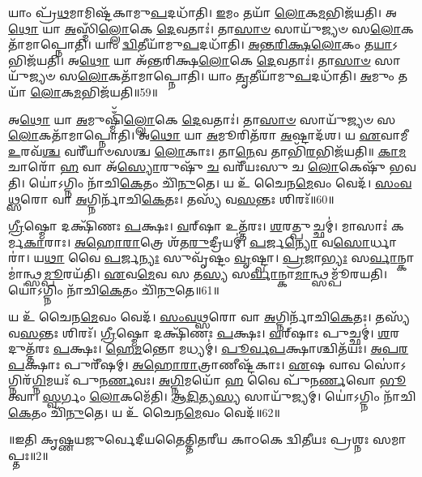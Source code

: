    𑌯𑌾𑌂 𑌪𑍍𑌰᳴\-\ul{𑌥}\-𑌮𑌾𑌮𑌿𑌷𑍍𑌟᳴𑌕𑌾𑌮𑍁\-\ul{𑌪}\-𑌦𑌧𑌾᳴𑌤𑌿।
   \ul{𑌇}\-𑌮𑌂 𑌤𑌯𑌾᳴ \ul{𑌲𑍋}\-𑌕\-\ul{𑌮}\-𑌭𑌿𑌜᳴𑌯𑌤𑌿।
   𑌅\-\ul{𑌥𑍋} 𑌯𑌾 \ul{𑌅}\-𑌸𑍍𑌮𑌿𑌁\-\ul{𑌲𑍍𑌲𑍋}\-𑌕𑍇 \ul{𑌦𑍇}\-𑌵𑌤𑌾𑌃॑।
   𑌤𑌾\-\ul{𑌸𑌾}\-\-\ul{𑍞} 𑌸𑌾𑌯𑍁᳴𑌜𑍍𑌯𑍞 𑌸\-\ul{𑌲𑍋}\-𑌕𑌤𑌾᳴𑌮𑌾\-𑌪𑍍𑌨𑍋𑌤𑌿।
   𑌯𑌾𑌂 \ul{𑌦𑍍𑌵𑌿}\-𑌤𑍀𑌯𑌾᳴𑌮𑍁\-\ul{𑌪}\-𑌦𑌧𑌾᳴𑌤𑌿।
   \ul{𑌅}\-\-\ul{𑌨𑍍𑌤}\-\-\ul{𑌰𑌿}\-\-\ul{𑌕𑍍𑌷}\-\-\ul{𑌲𑍋}\-𑌕𑌂 𑌤\-\ul{𑌯𑌾}\-𑌽𑌭𑌿𑌜᳴𑌯𑌤𑌿।
   𑌅\-\ul{𑌥𑍋} 𑌯𑌾 𑌅᳴𑌨𑍍𑌤𑌰𑌿𑌕𑍍𑌷\-\ul{𑌲𑍋}\-𑌕𑍇 \ul{𑌦𑍇}\-𑌵𑌤𑌾𑌃॑।
   𑌤𑌾\-\ul{𑌸𑌾}\-\-\ul{𑍞} 𑌸𑌾𑌯𑍁᳴𑌜𑍍𑌯𑍞 𑌸\-\ul{𑌲𑍋}\-𑌕𑌤𑌾᳴𑌮𑌾𑌪𑍍𑌨𑍋𑌤𑌿।
   𑌯𑌾𑌂 \ul{𑌤𑍃}\-𑌤𑍀𑌯𑌾᳴𑌮𑍁\-\ul{𑌪}\-𑌦𑌧𑌾᳴𑌤𑌿।
   \ul{𑌅}\-𑌮𑍁𑌂 𑌤𑌯𑌾᳴ \ul{𑌲𑍋}\-𑌕\-\ul{𑌮}\-𑌭𑌿𑌜᳴𑌯𑌤𑌿॥59॥

   𑌅\-\ul{𑌥𑍋} 𑌯𑌾 \ul{𑌅}\-𑌮𑍁𑌷𑍍𑌮𑌿𑌁᳴\-\ul{𑌲𑍍𑌲𑍋}\-𑌕𑍇 \ul{𑌦𑍇}\-𑌵𑌤𑌾𑌃॑।
   𑌤𑌾\-\ul{𑌸𑌾}\-\-\ul{𑍞} 𑌸𑌾𑌯𑍁᳴𑌜𑍍𑌯𑍞 𑌸\-\ul{𑌲𑍋}\-𑌕𑌤𑌾᳴𑌮𑌾\-𑌪𑍍𑌨𑍋𑌤𑌿।
   𑌅\-\ul{𑌥𑍋} 𑌯𑌾 \ul{𑌅}\-𑌮𑍂𑌰𑌿𑌤᳴𑌰𑌾 \ul{𑌅}\-𑌷𑍍𑌟𑌾𑌦᳴𑌶।
   𑌯 \ul{𑌏}\-𑌵𑌾𑌮𑍀 \ul{𑌉}\-𑌰𑌵᳴\-\ul{𑌶𑍍𑌚} 𑌵𑌰𑍀᳴𑌯𑌾𑍞𑌸𑌶𑍍𑌚 \ul{𑌲𑍋}\-𑌕𑌾𑌃।
   𑌤𑌾\-\ul{𑌨𑍇}\-𑌵 𑌤𑌾𑌭𑌿᳴\-\ul{𑌰}\-𑌭𑌿𑌜᳴𑌯𑌤𑌿॥
   \ul{𑌕𑌾}\-\-\ul{𑌮}\-𑌚𑌾𑌰𑍋᳴ \ul{𑌹} 𑌵𑌾 𑌅᳴\-\ul{𑌸𑍍𑌯𑍋}\-𑌰𑍁𑌷𑍁᳴ \ul{𑌚} 𑌵𑌰𑍀᳴𑌯𑌃𑌸𑍁 𑌚 \ul{𑌲𑍋}\-𑌕𑍇𑌷𑍁᳴ 𑌭𑌵𑌤𑌿।
   𑌯𑍋॑𑌽𑌗𑍍𑌨𑌿𑌂 𑌨𑌾᳴𑌚𑌿\-\ul{𑌕𑍇}\-𑌤𑌂 𑌚𑌿᳴\-\ul{𑌨𑍁}\-𑌤𑍇।
   𑌯 𑌉᳴ 𑌚𑍈𑌨\-\ul{𑌮𑍇}\-𑌵𑌂 𑌵𑍇𑌦᳴।
   \ul{𑌸𑌂}\-\-\ul{𑌵}\-\-\ul{𑌥𑍍𑌸}\-𑌰𑍋 𑌵𑌾 \ul{𑌅}\-𑌗𑍍𑌨𑌿𑌰𑍍𑌨𑌾᳴𑌚𑌿\-\ul{𑌕𑍇}\-𑌤𑌃।
   𑌤𑌸𑍍𑌯᳴ 𑌵\-\ul{𑌸}\-𑌨𑍍𑌤𑌃 𑌶𑌿𑌰𑌃᳴॥60॥

   \ul{𑌗𑍍𑌰𑍀}\-𑌷𑍍𑌮𑍋 𑌦𑌕𑍍𑌷𑌿᳴𑌣𑌃 \ul{𑌪}\-𑌕𑍍𑌷𑌃।
   \ul{𑌵}\-𑌰𑍍{‌}𑌷𑌾 𑌉𑌤𑍍𑌤᳴𑌰𑌃।
   \ul{𑌶}\-𑌰𑌤𑍍𑌪𑍁𑌚𑍍𑌛𑌮𑍍॑।
   𑌮𑌾𑌸𑌾𑌃॑ 𑌕𑌰𑍍𑌮\-\ul{𑌕𑌾}\-𑌰𑌾𑌃।
   \ul{𑌅}\-\-\ul{𑌹𑍋}\-\-\ul{𑌰𑌾}\-𑌤𑍍𑌰𑍇 𑌶᳴𑌤\-\ul{𑌰𑍁}\-𑌦𑍍𑌰𑍀𑌯𑌮𑍍॑।
   \ul{𑌪}\-𑌰𑍍𑌜\-\ul{𑌨𑍍𑌯𑍋} 𑌵\-\ul{𑌸𑍋}\-𑌰𑍍𑌧𑌾𑌰𑌾॑।
   𑌯\-\ul{𑌥𑌾} 𑌵𑍈 \ul{𑌪}\-𑌰𑍍𑌜\-\ul{𑌨𑍍𑌯𑌃} 𑌸𑍁𑌵𑍃᳴𑌷𑍍𑌟𑌂 \ul{𑌵𑍃}\-𑌷𑍍𑌟𑍍𑌵𑌾।
   \ul{𑌪𑍍𑌰}\-𑌜𑌾\-\ul{𑌭𑍍𑌯𑌃} 𑌸\-\ul{𑌰𑍍𑌵𑌾}\-𑌨𑍍𑌕𑌾𑌮𑌾॑𑌨𑍍𑌥𑍍𑌸\-\ul{𑌮𑍍𑌪𑍂}\-𑌰𑌯᳴𑌤𑌿।
   \ul{𑌏}\-𑌵\-\ul{𑌮𑍇}\-𑌵 𑌸 𑌤\-\ul{𑌸𑍍𑌯} 𑌸\-\ul{𑌰𑍍𑌵𑌾}\-𑌨𑍍𑌕𑌾\-\ul{𑌮𑌾}\-𑌨𑍍𑌥𑍍𑌸𑌮𑍍𑌪𑍂᳴𑌰𑌯𑌤𑌿।
   𑌯𑍋॑𑌽𑌗𑍍𑌨𑌿𑌂 𑌨𑌾᳴𑌚𑌿\-\ul{𑌕𑍇}\-𑌤𑌂 𑌚𑌿᳴\-\ul{𑌨𑍁}\-𑌤𑍇॥61॥

   𑌯 𑌉᳴ 𑌚𑍈𑌨\-\ul{𑌮𑍇}\-𑌵𑌂 𑌵𑍇𑌦᳴।
   \ul{𑌸𑌂}\-\-\ul{𑌵}\-\-\ul{𑌥𑍍𑌸}\-𑌰𑍋 𑌵𑌾 \ul{𑌅}\-𑌗𑍍𑌨𑌿𑌰𑍍𑌨𑌾᳴𑌚𑌿\-\ul{𑌕𑍇}\-𑌤𑌃।
   𑌤𑌸𑍍𑌯᳴ 𑌵\-\ul{𑌸}\-𑌨𑍍𑌤𑌃 𑌶𑌿𑌰𑌃᳴।
   \ul{𑌗𑍍𑌰𑍀}\-𑌷𑍍𑌮𑍋 𑌦𑌕𑍍𑌷𑌿᳴𑌣𑌃 \ul{𑌪}\-𑌕𑍍𑌷𑌃।
   \ul{𑌵}\-𑌰𑍍{‌}𑌷𑌾𑌃 𑌪𑍁𑌚𑍍𑌛𑌮𑍍॑।
   \ul{𑌶}\-𑌰𑌦𑍁𑌤𑍍𑌤᳴𑌰𑌃 \ul{𑌪}\-𑌕𑍍𑌷𑌃।
   \ul{𑌹𑍇}\-\-\ul{𑌮}\-𑌨𑍍𑌤𑍋 𑌮𑌧𑍍𑌯𑌮𑍍॑।
   \ul{𑌪𑍂}\-\-\ul{𑌰𑍍𑌵}\-\-\ul{𑌪}\-𑌕𑍍𑌷𑌾𑌶𑍍𑌚𑌿𑌤᳴𑌯𑌃।
   \ul{𑌅}\-\-\ul{𑌪}\-\-\ul{𑌰}\-\-\ul{𑌪}\-𑌕𑍍𑌷𑌾𑌃 𑌪𑍁𑌰𑍀᳴𑌷𑌮𑍍।
   \ul{𑌅}\-\-\ul{𑌹𑍋}\-\-\ul{𑌰𑌾}\-𑌤𑍍𑌰𑌾𑌣𑍀𑌷𑍍𑌟᳴𑌕𑌾𑌃।
   \ul{𑌏}\-𑌷 𑌵𑌾𑌵 𑌸𑍋॑𑌽𑌗𑍍𑌨𑌿𑌰᳴\-\ul{𑌗𑍍𑌨𑌿}\-𑌮𑌯𑌃᳴ 𑌪𑍁𑌨\-\ul{𑌰𑍍𑌣}\-𑌵𑌃।
   \ul{𑌅}\-\-\ul{𑌗𑍍𑌨𑌿}\-𑌮𑌯𑍋᳴ \ul{𑌹} 𑌵𑍈 𑌪𑍁᳴𑌨\-\ul{𑌰𑍍𑌣}\-𑌵𑍋 \ul{𑌭𑍂}\-𑌤𑍍𑌵𑌾।
   \ul{𑌸𑍍𑌵}\-𑌰𑍍𑌗𑌂 \ul{𑌲𑍋}\-𑌕𑌮𑍇᳴𑌤𑌿।
   \ul{𑌆}\-\-\ul{𑌦𑌿}\-𑌤𑍍𑌯\-\ul{𑌸𑍍𑌯} 𑌸𑌾𑌯𑍁᳴𑌜𑍍𑌯𑌮𑍍।
   𑌯𑍋॑𑌽𑌗𑍍𑌨𑌿𑌂 𑌨𑌾᳴𑌚𑌿\-\ul{𑌕𑍇}\-𑌤𑌂 𑌚𑌿᳴\-\ul{𑌨𑍁}\-𑌤𑍇।
   𑌯 𑌉᳴ 𑌚𑍈𑌨\-\ul{𑌮𑍇}\-𑌵𑌂 𑌵𑍇𑌦᳴॥62॥
\anuvakamend

  ॥𑌇𑌤𑌿 𑌕𑍃𑌷𑍍𑌣𑌯𑌜𑍁𑌰𑍍𑌵𑍇𑌦𑍀𑌯𑌤𑍈𑌤𑍍𑌤𑌿𑌤𑌰𑍀𑌯 𑌕𑌾𑌠𑌕𑍇 𑌦𑍍𑌵𑌿𑌤𑍀𑌯𑌃 𑌪𑍍𑌰𑌶𑍍𑌨𑌃 𑌸𑌮𑌾𑌪𑍍𑌤𑌃॥2॥


